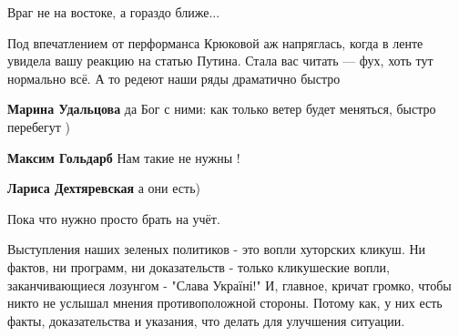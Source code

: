 \begin{itemize}
Враг не на востоке, а гораздо ближе...


 

Под впечатлением от перформанса Крюковой аж напряглась, когда в ленте увидела
вашу реакцию на статью Путина. Стала вас читать — фух, хоть тут нормально всё.
А то редеют наши ряды драматично быстро

\begin{itemize}
 
\textbf{Марина Удальцова} да Бог с ними: как только ветер будет меняться, быстро перебегут )

 
\textbf{Максим Гольдарб} Нам такие не нужны !

 
\textbf{Лариса Дехтяревская} а они есть)

 
Пока что нужно просто брать на учёт.

 

Выступления наших зеленых политиков - это вопли хуторских кликуш. Ни фактов, ни
программ, ни доказательств - только кликушеские вопли, заканчивающиеся лозунгом
- "Слава Україні!" И, главное, кричат громко, чтобы никто не услышал мнения
противоположной стороны. Потому как, у них есть факты, доказательства и
указания, что делать для улучшения ситуации.



\end{itemize}
\end{itemize}
